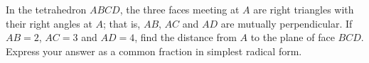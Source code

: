 In the tetrahedron $ABCD$, the three faces meeting at $A$ are right triangles with their right angles at $A$; that is, $AB$, $AC$ and $AD$ are mutually perpendicular. If $AB=2$, $AC=3$ and $AD=4$, find the distance from $A$ to the plane of face $BCD$. Express your answer as a common fraction in simplest radical form.
